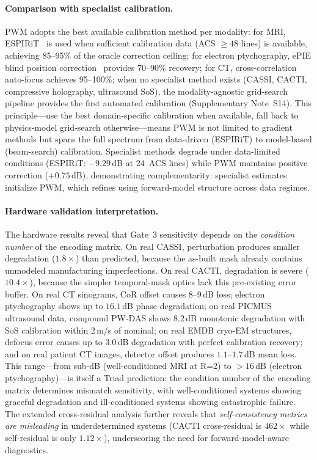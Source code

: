 \paragraph{Comparison with specialist calibration.}
PWM adopts the best available calibration method per modality: for MRI, ESPIRiT~\cite{uecker2014espirit} is used when sufficient calibration data (ACS $\geq 48$ lines) is available, achieving 85--95\% of the oracle correction ceiling; for electron ptychography, ePIE blind position correction~\cite{maiden2009ptychography} provides 70--90\% recovery; for CT, cross-correlation auto-focus achieves 95--100\%; when no specialist method exists (CASSI, CACTI, compressive holography, ultrasound SoS), the modality-agnostic grid-search pipeline provides the first automated calibration (Supplementary Note~S14). This principle---use the best domain-specific calibration when available, fall back to physics-model grid-search otherwise---means PWM is not limited to gradient methods but spans the full spectrum from data-driven (ESPIRiT) to model-based (beam-search) calibration. Specialist methods degrade under data-limited conditions (ESPIRiT: $-9.29$\,dB at 24~ACS lines) while PWM maintains positive correction ($+0.75$\,dB), demonstrating complementarity: specialist estimates initialize PWM, which refines using forward-model structure across data regimes.

\paragraph{Hardware validation interpretation.}
The hardware results reveal that Gate~3 sensitivity depends on the \emph{condition number} of the encoding matrix. On real CASSI, perturbation produces smaller degradation ($1.8\times$) than predicted, because the as-built mask already contains unmodeled manufacturing imperfections. On real CACTI, degradation is severe ($10.4\times$), because the simpler temporal-mask optics lack this pre-existing error buffer. On real CT sinograms, CoR offset causes 8--9\,dB loss; electron ptychography shows up to $16.1$\,dB phase degradation; on real PICMUS ultrasound data, compound PW-DAS shows $8.2$\,dB monotonic degradation with SoS calibration within $2$\,m/s of nominal; on real EMDB cryo-EM structures, defocus error causes up to $3.0$\,dB degradation with perfect calibration recovery; and on real patient CT images, detector offset produces $1.1$--$1.7$\,dB mean loss. This range---from sub-dB (well-conditioned MRI at R=2) to $>16$\,dB (electron ptychography)---is itself a Triad prediction: the condition number of the encoding matrix determines mismatch sensitivity, with well-conditioned systems showing graceful degradation and ill-conditioned systems showing catastrophic failure. The extended cross-residual analysis further reveals that \emph{self-consistency metrics are misleading} in underdetermined systems (CACTI cross-residual is $462\times$ while self-residual is only $1.12\times$), underscoring the need for forward-model-aware diagnostics.

